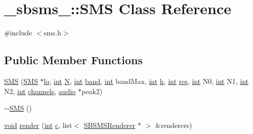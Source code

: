 \hypertarget{class__sbsms___1_1_s_m_s}{}\section{\+\_\+sbsms\+\_\+\+:\+:S\+MS Class Reference}
\label{class__sbsms___1_1_s_m_s}


{\ttfamily \#include $<$sms.\+h$>$}

\subsection*{Public Member Functions}
\begin{DoxyCompactItemize}
\item 
\hyperlink{class__sbsms___1_1_s_m_s_ab6cf7305c35a88ef18e006cbe6cc99a2}{S\+MS} (\hyperlink{class__sbsms___1_1_s_m_s}{S\+MS} $\ast$\hyperlink{class__sbsms___1_1_s_m_s_a6353b7fc02d0ff088902dd20d8811de1}{lo}, \hyperlink{xmltok_8h_a5a0d4a5641ce434f1d23533f2b2e6653}{int} \hyperlink{class__sbsms___1_1_s_m_s_af9839dbb967f3bd04a4b2b4768751e1f}{N}, \hyperlink{xmltok_8h_a5a0d4a5641ce434f1d23533f2b2e6653}{int} \hyperlink{class__sbsms___1_1_s_m_s_a88a9ac9f81a519c8d2b07b70ca33eb0c}{band}, \hyperlink{xmltok_8h_a5a0d4a5641ce434f1d23533f2b2e6653}{int} band\+Max, \hyperlink{xmltok_8h_a5a0d4a5641ce434f1d23533f2b2e6653}{int} \hyperlink{class__sbsms___1_1_s_m_s_a1f651e7489c4cb796fa6d55fb8ca5c70}{h}, \hyperlink{xmltok_8h_a5a0d4a5641ce434f1d23533f2b2e6653}{int} \hyperlink{class__sbsms___1_1_s_m_s_a091e988e65c11c86875e6ecdb1efbf91}{res}, \hyperlink{xmltok_8h_a5a0d4a5641ce434f1d23533f2b2e6653}{int} N0, \hyperlink{xmltok_8h_a5a0d4a5641ce434f1d23533f2b2e6653}{int} N1, \hyperlink{xmltok_8h_a5a0d4a5641ce434f1d23533f2b2e6653}{int} N2, \hyperlink{xmltok_8h_a5a0d4a5641ce434f1d23533f2b2e6653}{int} \hyperlink{class__sbsms___1_1_s_m_s_a8e89dccb17998302db6a1c4c5a0b7c8b}{channels}, \hyperlink{namespace__sbsms___a11786cc5bd221ff534972ae350477324}{audio} $\ast$peak2)
\item 
\hyperlink{class__sbsms___1_1_s_m_s_a5a8239e3ed67b4758440e83ced7dfe1d}{$\sim$\+S\+MS} ()
\item 
\hyperlink{sound_8c_ae35f5844602719cf66324f4de2a658b3}{void} \hyperlink{class__sbsms___1_1_s_m_s_a8ad20307678455cf895e85810f172b81}{render} (\hyperlink{xmltok_8h_a5a0d4a5641ce434f1d23533f2b2e6653}{int} \hyperlink{rfft2d_test_m_l_8m_ae0323a9039add2978bf5b49550572c7c}{c}, list$<$ \hyperlink{class__sbsms___1_1_s_b_s_m_s_renderer}{S\+B\+S\+M\+S\+Renderer} $\ast$ $>$ \&renderers)
\item 

\end{DoxyCompactItemize}

